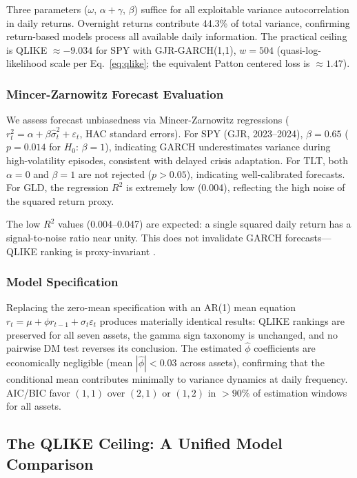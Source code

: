 Three parameters ($\omega$, $\alpha+\gamma$, $\beta$) suffice for all exploitable variance autocorrelation in daily returns. Overnight returns contribute 44.3\% of total variance, confirming return-based models process all available daily information. The practical ceiling is QLIKE $\approx -9.034$ for SPY with GJR-GARCH(1,1), $w = 504$ (quasi-log-likelihood scale per Eq.~\eqref{eq:qlike}; the equivalent Patton centered loss is $\approx 1.47$).

\subsubsection{Mincer-Zarnowitz Forecast Evaluation}

We assess forecast unbiasedness via Mincer-Zarnowitz regressions ($r^2_t = \alpha + \beta \hat{\sigma}^2_t + \varepsilon_t$, HAC standard errors). For SPY (GJR, 2023--2024), $\beta = 0.65$ ($p = 0.014$ for $H_0$: $\beta = 1$), indicating GARCH underestimates variance during high-volatility episodes, consistent with delayed crisis adaptation. For TLT, both $\alpha = 0$ and $\beta = 1$ are not rejected ($p > 0.05$), indicating well-calibrated forecasts. For GLD, the regression $R^2$ is extremely low (0.004), reflecting the high noise of the squared return proxy.

The low $R^2$ values (0.004--0.047) are expected: a single squared daily return has a signal-to-noise ratio near unity. This does not invalidate GARCH forecasts---QLIKE ranking is proxy-invariant \citep{patton2011}.

\subsubsection{Model Specification}
\label{sec:model_spec_robustness}

Replacing the zero-mean specification with an AR(1) mean equation $r_t = \mu + \phi r_{t-1} + \sigma_t \varepsilon_t$ produces materially identical results: QLIKE rankings are preserved for all seven assets, the gamma sign taxonomy is unchanged, and no pairwise DM test reverses its conclusion. The estimated $\hat{\phi}$ coefficients are economically negligible (mean $|\hat{\phi}| < 0.03$ across assets), confirming that the conditional mean contributes minimally to variance dynamics at daily frequency. AIC/BIC favor $(1,1)$ over $(2,1)$ or $(1,2)$ in $>90\%$ of estimation windows for all assets.

\subsection{The QLIKE Ceiling: A Unified Model Comparison}
\label{sec:qlike_ceiling}

